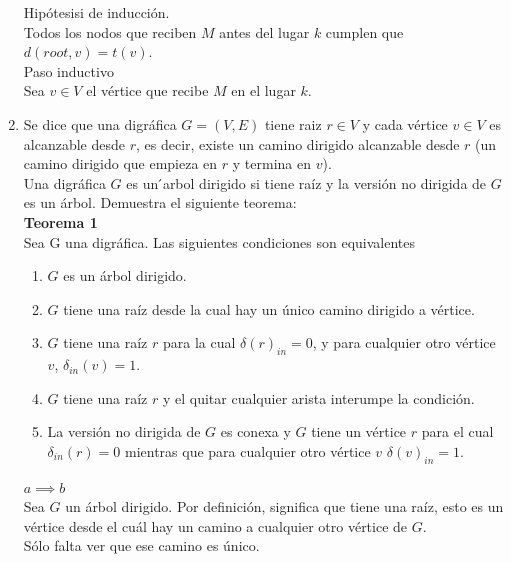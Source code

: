 \documentclass[12pt,a4paper]{report}
\begin{document}
\begin{enumerate}
{			Hipótesisi de inducción.\\
			Todos los nodos que reciben $M$ antes del lugar $k$ cumplen que
			$d(root, v) = t(v)$.\\

			Paso inductivo\\
			Sea $v \in V$ el vértice que recibe $M$ en el lugar $k$.

		}
		\item{
			Se dice que una digráfica $G = (V, E)$ tiene raiz $r \in V$ y cada
			vértice $v \in V$ es alcanzable desde $r$, es decir, existe un camino
			dirigido alcanzable desde $r$ (un camino dirigido que empieza en $r$ y
			termina en $v$).\\
			Una digráfica $G$ es un  ́arbol dirigido si tiene raíz y la versión no dirigida
			de $G$ es un árbol. Demuestra el siguiente teorema:\\

			\textbf{Teorema 1}\\
			Sea G una digráfica. Las siguientes condiciones son equivalentes
			\begin{enumerate} [label = \alph*)]
				\item {
					$G$ es un árbol dirigido.\\
				}
				\item {
					$G$ tiene una raíz desde la cual hay un único camino dirigido a
					vértice.\\
				}

				\item{
					$G$ tiene una raíz $r$ para la cual $\delta(r)_{in} = 0$, y para cualquier
					otro vértice $v$, $\delta_{in}(v) = 1$.\\
				}

				\item{
					$G$ tiene una raíz $r$ y el quitar cualquier arista interumpe la
					condición.\\
				}
				\item{
					La versión no dirigida de $G$ es conexa y $G$ tiene un vértice $r$ para
					el cual $\delta_{in}(r) = 0$ mientras que para cualquier otro vértice
					$v$ $\delta(v)_{in} = 1$.\\
				}
			\end{enumerate}

			$a \implies b$\\
			Sea $G$ un árbol dirigido. Por definición, significa que tiene una raíz,
			esto es un vértice desde el cuál hay un camino a cualquier otro vértice de
			$G$.\\
			Sólo falta ver que ese camino es único.\\

}
\end{enumerate}
\end{document}
